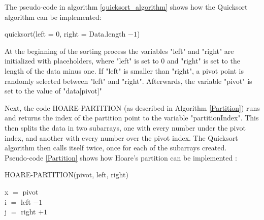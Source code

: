 The pseudo-code in algorithm \ref{quicksort_algorithm} shows how the Quicksort algorithm can be implemented:

\begin{algorithm} [H] 
\caption{quicksort(left = $0$, right = Data.length $- 1$)} \label{quicksort_algorithm}
\SetAlgoNoLine


\end{algorithm}

At the beginning of the sorting process the variables "left" and "right" are initialized with placeholders, where "left" is set to 0 and "right" is set to the length of the data minus one. If "left" is smaller than "right", a pivot point is randomly selected between "left" and "right". Afterwards, the variable "pivot" is set to the value of "data[pivot]" 

Next, the code HOARE-PARTITION (as described in Algorithm \ref{Partition}) runs and returns the index of the partition point to the variable "partitionIndex". This then splits the data in two subarrays, one with every number under the pivot index, and another with every number over the pivot index. The Quicksort algorithm then calls itself twice, once for each of the subarrays created.
\\
Pseudo-code \ref{Partition} shows how Hoare's partition can be implemented \cite{Introduction_to_algorithms}:

\begin{algorithm} [H] \caption{HOARE-PARTITION(pivot, left, right)}\label{Partition}
\DontPrintSemicolon
\SetAlgoNoLine
    x $=$ pivot\\
    i $=$ left $- 1$\\
    j $=$ right $+ 1$\\

\end{algorithm}

